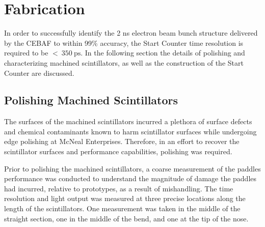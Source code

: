 \section{Fabrication}

In order to successfully identify the 2 ns electron beam bunch structure delivered by the CEBAF to within 99\% accuracy, the \gx{} Start Counter time resolution is required to be $<\ 350\ \mathrm{ps}$.  In the following section the details of polishing and characterizing machined scintillators, as well as the construction of the Start Counter are discussed.

\subsection{Polishing Machined Scintillators}

The surfaces of the machined scintillators incurred a plethora of surface defects and chemical contaminants known to harm scintillator surfaces while undergoing edge polishing at McNeal Enterprises.  Therefore, in an effort to recover the scintillator surfaces and performance capabilities, polishing was required.

Prior to polishing the machined scintillators, a coarse measurement of the paddles performance was conducted to understand the magnitude of damage the paddles had incurred, relative to prototypes, as a result of mishandling.  The time resolution and light output was measured at three precise locations along the length of the scintillators. One measurement was taken in the middle of the straight section, one in the middle of the bend, and one at the tip of the nose. 

